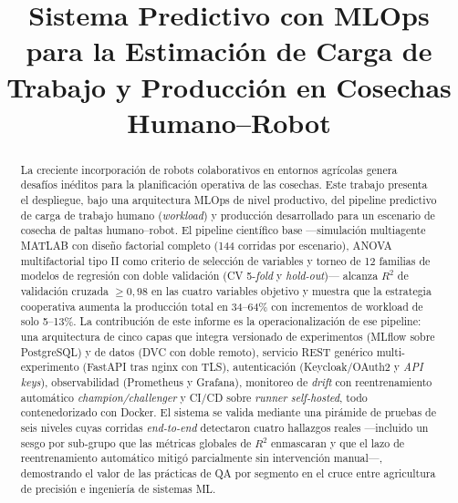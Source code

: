 \documentclass[conference]{IEEEtran}
\begin{document}
\title{Sistema Predictivo con MLOps para la Estimación de Carga de\\
Trabajo y Producción en Cosechas Humano--Robot}

\author{
}

\maketitle

\begin{abstract}
La creciente incorporación de robots colaborativos en entornos agrícolas genera desafíos inéditos para la planificación operativa de las cosechas. Este trabajo presenta el despliegue, bajo una arquitectura MLOps de nivel productivo, del pipeline predictivo de carga de trabajo humano (\textit{workload}) y producción desarrollado para un escenario de cosecha de paltas humano--robot. El pipeline científico base —simulación multiagente MATLAB con diseño factorial completo (144 corridas por escenario), ANOVA multifactorial tipo II como criterio de selección de variables y torneo de 12 familias de modelos de regresión con doble validación (CV 5-\textit{fold} y \textit{hold-out})— alcanza $R^2$ de validación cruzada $\geq 0{,}98$ en las cuatro variables objetivo y muestra que la estrategia cooperativa aumenta la producción total en 34--64\% con incrementos de workload de solo 5--13\%. La contribución de este informe es la operacionalización de ese pipeline: una arquitectura de cinco capas que integra versionado de experimentos (MLflow sobre PostgreSQL) y de datos (DVC con doble remoto), servicio REST genérico multi-experimento (FastAPI tras nginx con TLS), autenticación (Keycloak/OAuth2 y \textit{API keys}), observabilidad (Prometheus y Grafana), monitoreo de \textit{drift} con reentrenamiento automático \textit{champion/challenger} y CI/CD sobre \textit{runner self-hosted}, todo contenedorizado con Docker. El sistema se valida mediante una pirámide de pruebas de seis niveles cuyas corridas \textit{end-to-end} detectaron cuatro hallazgos reales —incluido un sesgo por sub-grupo que las métricas globales de $R^2$ enmascaran y que el lazo de reentrenamiento automático mitigó parcialmente sin intervención manual—, demostrando el valor de las prácticas de QA por segmento en el cruce entre agricultura de precisión e ingeniería de sistemas ML.
\end{abstract}
\end{document}
